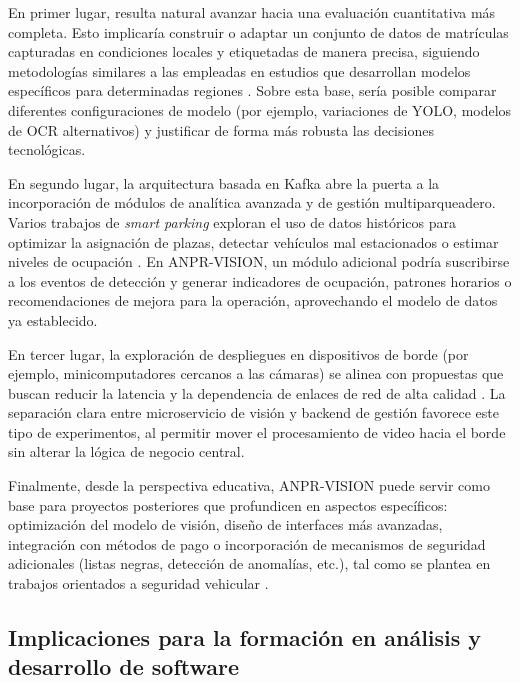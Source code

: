 En primer lugar, resulta natural avanzar hacia una evaluación cuantitativa más completa. Esto implicaría construir o adaptar un conjunto de datos de matrículas capturadas en condiciones locales y etiquetadas de manera precisa, siguiendo metodologías similares a las empleadas en estudios que desarrollan modelos específicos para determinadas regiones \cite{software_libre_mercosur_2016,anpr_pakistan_2020}. Sobre esta base, sería posible comparar diferentes configuraciones de modelo (por ejemplo, variaciones de YOLO, modelos de OCR alternativos) y justificar de forma más robusta las decisiones tecnológicas.

En segundo lugar, la arquitectura basada en Kafka abre la puerta a la incorporación de módulos de analítica avanzada y de gestión multi\-parqueadero. Varios trabajos de \textit{smart parking} exploran el uso de datos históricos para optimizar la asignación de plazas, detectar vehículos mal estacionados o estimar niveles de ocupación \cite{smart_parking_wrongly_parked_2023,smart_parking_lpr_efficiency_2024}. En ANPR-VISION, un módulo adicional podría suscribirse a los eventos de detección y generar indicadores de ocupación, patrones horarios o recomendaciones de mejora para la operación, aprovechando el modelo de datos ya establecido.

En tercer lugar, la exploración de despliegues en dispositivos de borde (por ejemplo, minicomputadores cercanos a las cámaras) se alinea con propuestas que buscan reducir la latencia y la dependencia de enlaces de red de alta calidad \cite{realtime_ocr_wsn_its_2019}. La separación clara entre microservicio de visión y backend de gestión favorece este tipo de experimentos, al permitir mover el procesamiento de video hacia el borde sin alterar la lógica de negocio central.

Finalmente, desde la perspectiva educativa, ANPR-VISION puede servir como base para proyectos posteriores que profundicen en aspectos específicos: optimización del modelo de visión, diseño de interfaces más avanzadas, integración con métodos de pago o incorporación de mecanismos de seguridad adicionales (listas negras, detección de anomalías, etc.), tal como se plantea en trabajos orientados a seguridad vehicular \cite{anpr_security_bangladesh_2025}.

\subsection{Implicaciones para la formación en análisis y desarrollo de software}

